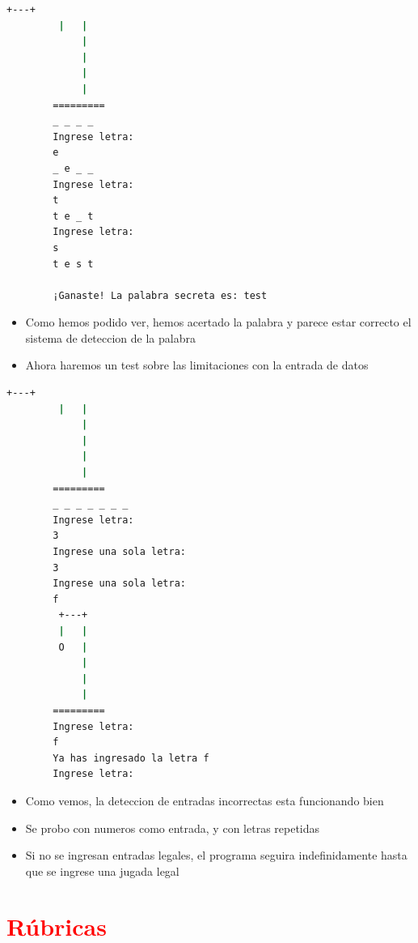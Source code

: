 \documentclass{article}
\begin{document}
        \begin{lstlisting}[language=bash, caption={Ejecucion en la linea de comandos}]
         +---+
         |   |
             |
             |
             |
             |
        =========
        _ _ _ _
        Ingrese letra:
        e
        _ e _ _
        Ingrese letra:
        t
        t e _ t
        Ingrese letra:
        s
        t e s t
        
        ¡Ganaste! La palabra secreta es: test

        \end{lstlisting}
        \begin{itemize}
            \item Como hemos podido ver, hemos acertado la palabra y parece estar correcto el sistema de deteccion de la palabra
            \item Ahora haremos un test sobre las limitaciones con la entrada de datos
        \end{itemize}
        \begin{lstlisting}[language=bash, caption={Ejecucion por terminal del juego del Ahorcado}]
         +---+
         |   |
             |
             |
             |
             |
        =========
        _ _ _ _ _ _ _
        Ingrese letra:
        3
        Ingrese una sola letra:
        3
        Ingrese una sola letra:
        f
         +---+
         |   |
         O   |
             |
             |
             |
        =========
        Ingrese letra:
        f
        Ya has ingresado la letra f
        Ingrese letra:
        \end{lstlisting}
        \begin{itemize}
            \item Como vemos, la deteccion de entradas incorrectas esta funcionando bien
            \item Se probo con numeros como entrada, y con letras repetidas
            \item Si no se ingresan entradas legales, el programa seguira indefinidamente hasta que se ingrese una jugada legal
        \end{itemize}
	\section{\textcolor{red}{Rúbricas}}
	
\end{document}
